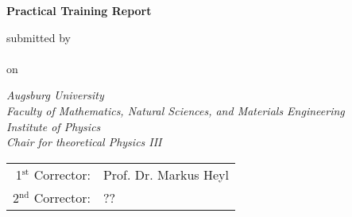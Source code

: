 

\newcommand{\mail}{jonas.kell@student.uni-augsburg.de}



\begin{titlepage}
    
\color{dblue}

\begin{center}
    \vspace*{2cm}
    \Huge
    \textbf{\thetitle}

    \vspace*{1.5cm}
    \color{black}
    \textbf{Practical Training Report}

    \vspace*{1cm}
    \normalsize
    submitted by\\
    \LARGE
    \theauthor\\\vspace*{0.3cm}
    \normalsize
    on \thedate

    \vspace{1.8cm}
    \color{black}
    \emph{Augsburg University}\\
    \emph{Faculty of Mathematics, Natural Sciences, and Materials Engineering}\\
    \emph{Institute of Physics}\\
    \emph{Chair for theoretical Physics III}

    \vfill

    \begin{tabular}{rl}
        1$^\text{st}$ Corrector: &Prof. Dr. Markus Heyl\\
        2$^\text{nd}$ Corrector: &??\\ %
    \end{tabular}
\end{center}

\end{titlepage}
